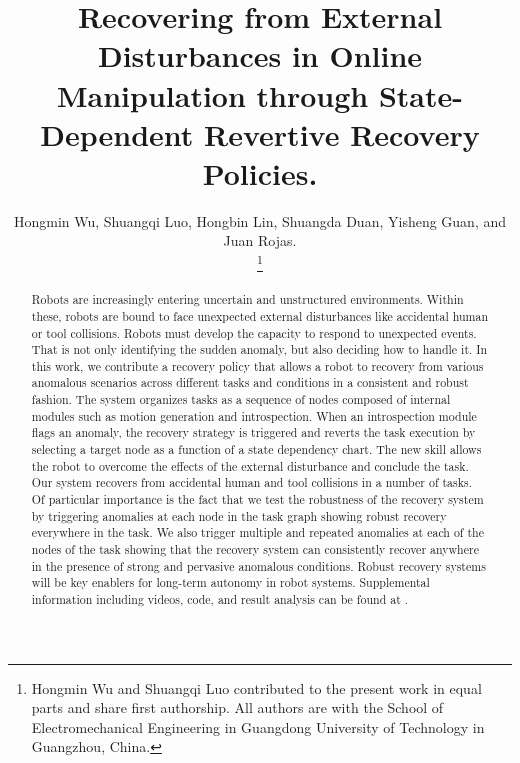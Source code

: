 \documentclass[letterpaper, 10 pt, conference]{ieeeconf}  %
\title{\LARGE \bf Recovering from External Disturbances in Online Manipulation through State-Dependent Revertive Recovery Policies.}
\author{Hongmin Wu, Shuangqi Luo, Hongbin Lin, Shuangda Duan, Yisheng Guan, and Juan Rojas. \\%
\thanks{Hongmin Wu and Shuangqi Luo contributed to the present work in equal parts and share first authorship. All authors are with the School of Electromechanical Engineering in Guangdong University of Technology in Guangzhou, China.}%
}
\begin{document}
\maketitle
\thispagestyle{empty}
\pagestyle{empty}
\begin{abstract}
Robots are increasingly entering uncertain and unstructured environments. Within these, robots are bound to face unexpected external disturbances like accidental human or tool collisions. Robots must develop the capacity to respond to unexpected events. That is not only identifying the sudden anomaly, but also deciding how to handle it. 
In this work, we contribute a recovery policy that allows a robot to recovery from various anomalous scenarios across different tasks and conditions in a consistent and robust fashion. 
The system organizes tasks as a sequence of nodes composed of internal modules such as motion generation and introspection. When an introspection module flags an anomaly, the recovery strategy is triggered and reverts the task execution by selecting a target node as a function of a state dependency chart. The new skill allows the robot to overcome the effects of the external disturbance and conclude the task. 
Our system recovers from accidental human and tool collisions in a number of tasks. Of particular importance is the fact that we test the robustness of the recovery system by triggering anomalies at each node in the task graph showing robust recovery everywhere in the task. We also trigger multiple and repeated anomalies at each of the nodes of the task showing that the recovery system can consistently recover anywhere in the presence of strong and pervasive anomalous conditions. Robust recovery systems will be key enablers for long-term autonomy in robot systems.
Supplemental information including videos, code, and result analysis can be found at \cite{2017Humanoids-Rojas-supplementalURL}.
\end{abstract}
\end{document}
